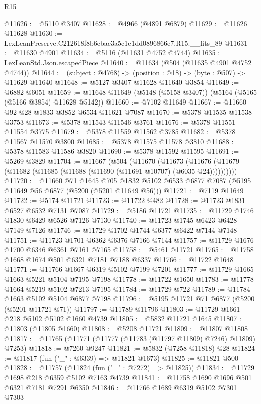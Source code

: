 \begin{lexlean}{R15}
\begin{coremodule}
{{{{{{{{{{{@11626 := @5110 @3407
@11628 := @4966 (@4891 @6879)
@11629 := @11626 @11628
@11630 := LexLeanPreserve.C212618f8b6ebac3a5c1e1dd0896866e7.R15.__fits_89
@11631 := @11630 @4901
@11634 := @5116 (@11631 @4752 @4744)
@11635 := LexLeanStd.Json.escapedPiece
@11640 := @11634 (@504 (@11635 @4901 @4752 @4744))
@11644 := (subject : @4768) -> (position : @18) -> (byte : @507) -> @11629 @11640
@11648 := @5127 @3407 @11628 @11640 @3854
@11649 := @6882 @6051
@11659 := @11648 @11649 (@5148 (@5158 @3407)) (@5164 (@5165 (@5166 @3854) @11628 @5142))
@11660 := @7102 @11649
@11667 := @11660 @92 @28 @1833 @3852 @6534 @11621 @7087
@11670 := @5378 @11535 @11538 @3753
@11673 := @5378 @11543 @11546 @3761
@11676 := @5378 @11551 @11554 @3775
@11679 := @5378 @11559 @11562 @3785
@11682 := @5378 @11567 @11570 @3800
@11685 := @5378 @11575 @11578 @3810
@11688 := @5378 @11583 @11586 @3820
@11690 := @5378 @11592 @11595
@11691 := @5269 @3829
@11704 := @11667
    (@504
      (@11670
        (@11673 (@11676 (@11679 (@11682 (@11685 (@11688 (@11690 (@11691 @10707) (@6035 @24))))))))))
@11720 := @11660
    @71
    @1645
    @705
    @1832
    @5102
    @6533
    @6877
    @7087
    (@5195 @11649 @56 @6877 (@5200 (@5201 @11649 @56)))
@11721 := @7119 @11649
@11722 := @5174 @11721
@11723 := @11722 @482
@11728 := @11723 @1831 @6527 @6532 @7131 @7087
@11729 := @5186 @11721
@11735 := @11729 @1746 @1830 @6429 @6526 @7126 @7130
@11740 := @11723 @1745 @6423 @6428 @7149 @7126
@11746 := @11729 @1702 @1744 @6377 @6422 @7144 @7148
@11751 := @11723 @1701 @6362 @6376 @7166 @7144
@11757 := @11729 @1676 @1700 @6346 @6361 @7161 @7165
@11758 := @5461 @11721
@11765 := @11758 @1668 @1674 @501 @6321 @7181 @7188 @6337
@11766 := @11722 @1648
@11771 := @11766 @1667 @6319 @5102 @7199 @7201
@11777 := @11729 @1665 @1663 @5221 @5104 @7195 @7198
@11778 := @11722 @1650
@11783 := @11778 @1664 @5219 @5102 @7213 @7195
@11784 := @11729 @722
@11789 := @11784 @1663 @5102 @5104 @6877 @7198
@11796 := @5195 @11721 @71 @6877 (@5200 (@5201 @11721 @71))
@11797 := @11789 @11796
@11803 := @11729 @1661 @218 @5102 @5102 @1660 @4739
@11805 := @5832 @11721 @1645
@11807 := @11803 (@11805 @1660)
@11808 := @5208 @11721
@11809 := @11807 @11808
@11817 := @11765 (@11771 (@11777 (@11783 (@11797 @11809) @7246) @11809) @7253)
@11818 := @7260 @9247
@11821 := @5832 (@7258 @11818) @28
@11824 := @11817 (fun ("_" : @6339) => @11821 @1673)
@11825 := @11821 @500
@11828 := @11757 (@11824 (fun ("_" : @7272) => @11825))
@11834 := @11729 @1698 @218 @6359 @5102 @7163 @4739
@11841 := @11758 @1690 @1696 @501 @6321 @7181 @7291 @6350
@11846 := @11766 @1689 @6319 @5102 @7301 @7303
}}}}}}}}}}}
\end{coremodule}
\end{lexlean}
